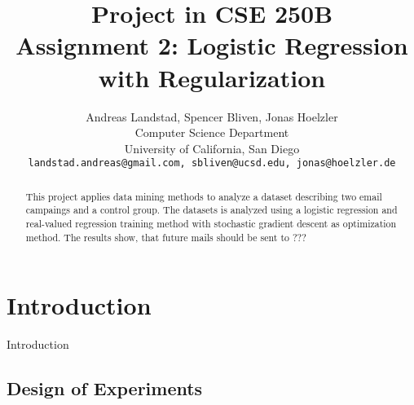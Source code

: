 \documentclass[10pt,twocolumn,letterpaper]{article}
\begin{document}
\title{
Project in CSE 250B\\
Assignment 2: Logistic Regression with Regularization}

\author{Andreas Landstad, Spencer Bliven, Jonas Hoelzler\\
Computer Science Department\\
University of California, San Diego\\
{\tt\small landstad.andreas@gmail.com, sbliven@ucsd.edu, jonas@hoelzler.de}
}%
\maketitle
\thispagestyle{empty}

\begin{abstract}
This project applies data mining methods to analyze a dataset describing two email campaings and a control group. The datasets is analyzed using a logistic regression and real-valued regression training method with stochastic gradient descent as optimization method.
The results show, that future mails should be sent to ???
\end{abstract}

\section{Introduction}
Introduction
\subsection{Design of Experiments}
\end{document}
